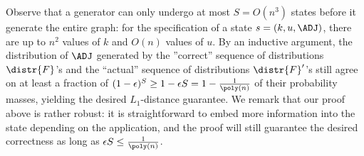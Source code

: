 Observe that a generator can only undergo at most $S = O(n^3)$ states before it generate the entire graph: for the specification of a state $s = (k, u, \ADJ)$, there are up to $n^2$ values of $k$ and $O(n)$ values of $u$. By an inductive argument, the distribution of $\ADJ$ generated by the ''correct'' sequence of distributions $\distr{F}$'s and the ``actual'' sequence of distributions $\distr{F}'$'s still agree on at least a fraction of $(1-\epsilon)^S \geq 1-\epsilon S = 1-\frac{1}{\poly(n)}$ of their probability masses, yielding the desired $L_1$-distance guarantee.
We remark that our proof above is rather robust: it is straightforward to embed more information into the state depending on the application, and the proof will still guarantee the desired correctness as long as $\epsilon S \leq \frac{1}{\poly(n)}$.
\fi

